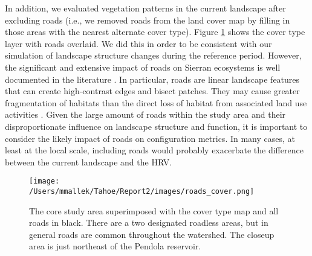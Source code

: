 

In addition, we evaluated vegetation patterns in the current landscape after excluding roads (i.e., we removed roads from the land cover map by filling in those areas with the nearest alternate cover type). Figure \ref{fig:roadcovermap} shows the cover type layer with roads overlaid. We did this in order to be consistent with our simulation of landscape structure changes during the reference period. However, the significant and extensive impact of roads on Sierran ecosystems is well documented in the literature \citep{Karr2004,Trombulak2000,Gucinski2001,Theobald2011}.  In particular, roads are linear landscape features that can create high-contrast edges and bisect patches. They may cause greater fragmentation of habitats than the direct loss of habitat from associated land use activities \citep{Gucinski2001,Tinker1998,Mcgarigal2001}. Given the large amount of roads within the study area and their disproportionate influence on landscape structure and function, it is important to consider the likely impact of roads on configuration metrics. In many cases, at least at the local scale, including roads would probably exacerbate the difference between the current landscape and the HRV.
%
\begin{figure}[!htbp]
  \centering
  \texttt{[image: /Users/mmallek/Tahoe/Report2/images/roads\_cover.png]}
  \caption{The core study area superimposed with the cover type map and all roads in black. There are a two designated roadless areas, but in general roads are common throughout the watershed. The closeup area is just northeast of the Pendola reservoir.} 
  \label{fig:roadcovermap}
\end{figure}
%


